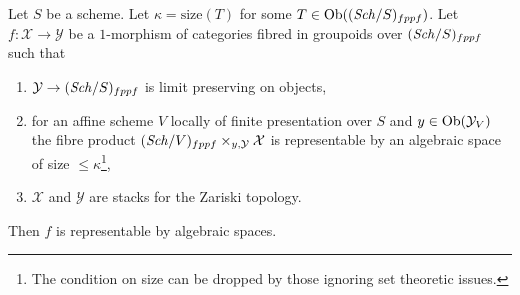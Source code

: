 \begin{lemma}
\label{lemma-check-representable-limit-preserving}
Let $S$ be a scheme.
Let $\kappa = \text{size}(T)$ for some $T \in \mathop{\mathrm{Ob}}\nolimits((\mathit{Sch}/S)_{fppf})$.
Let $f : \mathcal{X} \to \mathcal{Y}$ be a $1$-morphism
of categories fibred in groupoids over $(\mathit{Sch}/S)_{fppf}$
such that
\begin{enumerate}
\item $\mathcal{Y} \to (\mathit{Sch}/S)_{fppf}$ is limit preserving on objects,
\item for an affine scheme $V$ locally of finite presentation over $S$ and
$y \in \mathop{\mathrm{Ob}}\nolimits(\mathcal{Y}_V)$ the fibre product
$(\mathit{Sch}/V)_{fppf} \times_{y, \mathcal{Y}} \mathcal{X}$ is representable
by an algebraic space of size $\leq \kappa$\footnote{The condition on
size can be dropped by those ignoring set theoretic issues.},
\item $\mathcal{X}$ and $\mathcal{Y}$ are stacks for the Zariski topology.
\end{enumerate}
Then $f$ is representable by algebraic spaces.
\end{lemma}


